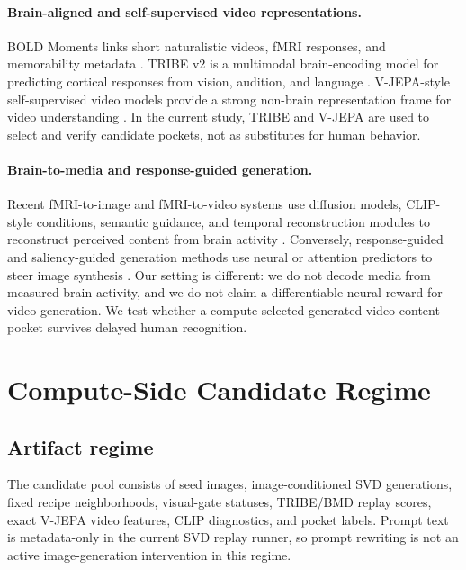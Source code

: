 \documentclass[11pt]{article}
\begin{document}
\paragraph{Brain-aligned and self-supervised video representations.}
BOLD Moments links short naturalistic videos, fMRI responses, and memorability
metadata \citep{lahner2024boldmoments}. TRIBE v2 is a multimodal
brain-encoding model for predicting cortical responses from vision, audition,
and language \citep{tribev2}. V-JEPA-style self-supervised video models provide
a strong non-brain representation frame for video understanding
\citep{bardes2025vjepa2}. In the current study, TRIBE and V-JEPA are used to
select and verify candidate pockets, not as substitutes for human behavior.

\paragraph{Brain-to-media and response-guided generation.}
Recent fMRI-to-image and fMRI-to-video systems use diffusion models,
CLIP-style conditions, semantic guidance, and temporal reconstruction modules to
reconstruct perceived content from brain activity
\citep{lu2023minddiffuser,chen2023mindvideo,gong2024neuroclips,
sun2024neurocine,yang2026semvideo}. Conversely, response-guided and
saliency-guided generation methods use neural or attention predictors to steer
image synthesis \citep{pierzchlewicz2023energyguided,zhang2025gazefusion,
wang2024sgool}. Our setting is different: we do not decode media from measured
brain activity, and we do not claim a differentiable neural reward for video
generation. We test whether a compute-selected generated-video content pocket
survives delayed human recognition.

\section{Compute-Side Candidate Regime}

\subsection{Artifact regime}

The candidate pool consists of seed images, image-conditioned SVD generations,
fixed recipe neighborhoods, visual-gate statuses, TRIBE/BMD replay scores,
exact V-JEPA video features, CLIP diagnostics, and pocket labels. Prompt text is
metadata-only in the current SVD replay runner, so prompt rewriting is not an
active image-generation intervention in this regime.
\end{document}
